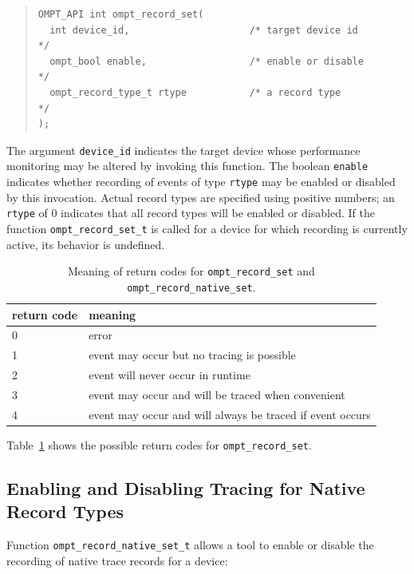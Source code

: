 \documentclass{article}
\begin{document}
\begin{quote}
\begin{verbatim}
OMPT_API int ompt_record_set(
  int device_id,                     /* target device id          */
  ompt_bool enable,                  /* enable or disable         */
  ompt_record_type_t rtype           /* a record type             */
);
\end{verbatim}
\end{quote}
The argument \verb|device_id| indicates the target device whose performance monitoring may be altered by invoking this function. The boolean \verb|enable| indicates whether recording of events of type \verb|rtype| may be enabled or disabled by this invocation.
Actual record types are specified using positive numbers; an \verb|rtype| of  0 indicates that all record types will be enabled or disabled.
If the function \verb|ompt_record_set_t| is called for a device for which recording is currently active, its behavior is undefined.

\begin{table}
\centering
\begin{tabular}{|l|l|}
\hline
return code & meaning \\\hline
0 & error\\\hline
1 & event may occur but no tracing is possible\\\hline
2 & event will never occur in runtime\\\hline
3 & event may occur and will be traced  when convenient\\\hline
4 & event may occur and will always be traced if event occurs\\\hline
\end{tabular}
\caption{Meaning of return codes for {\tt ompt\_record\_set} and  {\tt ompt\_record\_native\_set}.}
\label{table:record_set}
\end{table}

Table~\ref{table:record_set} shows the possible return codes for \verb|ompt_record_set|.


\subsection{Enabling and Disabling Tracing for Native Record Types}
\label{sec:trace-event-native}
Function \verb|ompt_record_native_set_t| allows a tool to enable or disable the recording of native trace records for a device:
\end{document}
